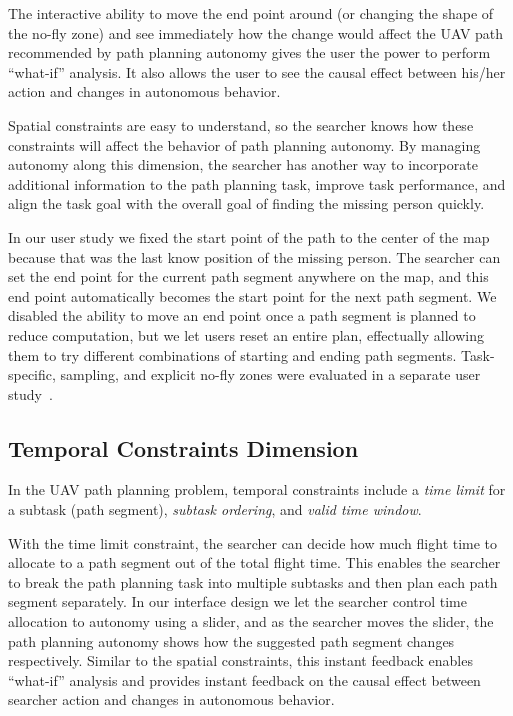 The interactive ability to move the end point around (or changing the shape of the no-fly zone) and see immediately how the change would affect the UAV path recommended by path planning autonomy gives the user the power to perform ``what-if'' analysis. It also allows the user to see the causal effect between his/her action and changes in autonomous behavior.

Spatial constraints are easy to understand, so the searcher knows how these constraints will affect the behavior of path planning autonomy. By managing autonomy along this dimension, the searcher has another way to incorporate additional information to the path planning task, improve task performance, and align the task goal with the overall goal of finding the missing person quickly. 

In our user study we fixed the start point of the path to the center of the map because that was the last know position of the missing person. The searcher can set the end point for the current path segment anywhere on the map, and this end point automatically becomes the start point for the next path segment. We disabled the ability to move an end point once a path segment is planned to reduce computation, but we let users reset an entire plan, effectually allowing them to try different combinations of starting and ending path segments. Task-specific, sampling, and explicit no-fly zones were evaluated in a separate user study~\cite{Clark2013Hierarchical}.

\subsection{Temporal Constraints Dimension}

In the UAV path planning problem, temporal constraints include a \textit{time limit} for a subtask (path segment), \textit{subtask ordering}, and \textit{valid time window}.

With the time limit constraint, the searcher can decide how much flight time to allocate to a path segment out of the total flight time. This enables the searcher to break the path planning task into multiple subtasks and then plan each path segment separately. In our interface design we let the searcher control time allocation to autonomy using a slider, and as the searcher moves the slider, the path planning autonomy shows how the suggested path segment changes respectively. Similar to the spatial constraints, this instant feedback enables ``what-if'' analysis and provides instant feedback on the causal effect between searcher action and changes in autonomous behavior.

